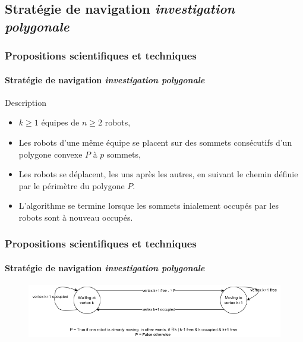 \documentclass{beamer}
\begin{document}
		\subsection{Stratégie de navigation \textit{investigation polygonale}}
			\begin{frame}
				\frametitle{Propositions scientifiques et techniques}
				\framesubtitle{Stratégie de navigation \textit{investigation polygonale}}
				\begin{block}{Description}
					\begin{itemize}
						\item $k \ge 1$ équipes de $n \ge 2$ robots,
						\item Les robots d'une même équipe se placent sur des sommets consécutifs d'un polygone convexe $P$ à $p$ sommets,
						\item Les robots se déplacent, les uns après les autres, en suivant le chemin définie par le périmètre du polygone $P$.
						\item L'algorithme se termine lorsque les sommets inialement occupés par les robots sont à nouveau occupés.
					\end{itemize}
				\end{block}
			\end{frame}
			\begin{frame}
				\frametitle{Propositions scientifiques et techniques}
				\framesubtitle{Stratégie de navigation \textit{investigation polygonale}}
				\begin{figure}
					\centering
					\includegraphics[width=1.0\textwidth]{graphics/automat_poly.png}
				\end{figure}
			\end{frame}
\end{document}
